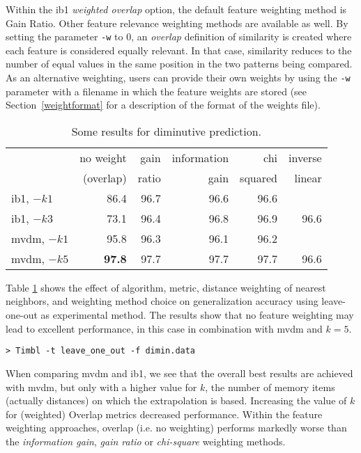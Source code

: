 \documentclass{report}
\begin{document}
Within the {\sc ib1} {\em weighted overlap} option, the default
feature weighting method is Gain Ratio. Other feature relevance
weighting methods are available as well.  By setting the parameter
{\tt -w} to 0, an {\em overlap} definition of similarity is created
where each feature is considered equally relevant. In that case, similarity reduces
to the number of equal values in the same position in the
two patterns being compared. As an alternative weighting, users can
provide their own weights by using the {\tt -w} parameter with a
filename in which the feature weights are stored (see
Section~\ref{weightformat} for a description of the format of the
weights file).

\begin{table}
\begin{center}
\begin{tabular}{l|rrrrr}
             & no weight & gain  & information & chi     & inverse \\
             & (overlap) & ratio & gain        & squared & linear\\
\noalign{\smallskip}
\hline
\noalign{\smallskip}
{\sc ib1},  $-k1$ & 86.4 & 96.7 & 96.6 & 96.6 &      \\
{\sc ib1},  $-k3$ & 73.1 & 96.4 & 96.8 & 96.9 & 96.6 \\
{\sc mvdm}, $-k1$ & 95.8 & 96.3 & 96.1 & 96.2 &      \\
{\sc mvdm}, $-k5$ & {\bf 97.8} & 97.7 & 97.7 & 97.7 & 96.6 \\

\end{tabular}
\caption{Some results for diminutive prediction.}
\label{diminresults}
\end{center}
\end{table}

Table \ref{diminresults} shows the effect of algorithm, metric,
distance weighting of nearest neighbors, and weighting method choice
on generalization accuracy using leave-one-out as experimental
method. The results show that no feature weighting may lead to
excellent performance, in this case in combination with {\sc mvdm} and
$k=5$.

{\footnotesize
\begin{verbatim}
> Timbl -t leave_one_out -f dimin.data
\end{verbatim}
}

When comparing {\sc mvdm} and {\sc ib1}, we see that the overall best
results are achieved with {\sc mvdm}, but only with a higher value for
$k$, the number of memory items (actually distances) on which the
extrapolation is based. Increasing the value of $k$ for (weighted)
Overlap metrics decreased performance. Within the feature weighting
approaches, overlap (i.e. no weighting) performs markedly worse than
the {\em information gain}, {\em gain ratio} or {\em
chi-square} weighting methods. 
\end{document}
